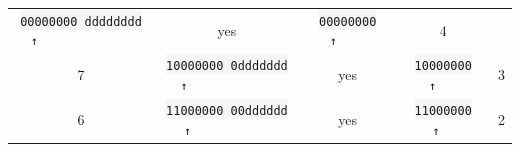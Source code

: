 \begin{longtable}[]{@{}ccccc@{}}
\begin{minipage}[t]{0.26\columnwidth}
\colorbox{WhiteSmoke}{\lstinline!00000000 dddddddd!} \small\verb!   ↑             !\strut
\end{minipage} & \begin{minipage}[t]{0.18\columnwidth}\centering\strut
yes\strut
\end{minipage} & \begin{minipage}[t]{0.14\columnwidth}\centering\strut
\colorbox{WhiteSmoke}{\lstinline!00000000!} \small\verb!   ↑    !\strut
\end{minipage} & \begin{minipage}[t]{0.14\columnwidth}\centering\strut
4\strut
\end{minipage}\tabularnewline
\begin{minipage}[t]{0.13\columnwidth}\centering\strut
7\strut
\end{minipage} & \begin{minipage}[t]{0.26\columnwidth}\centering\strut
\colorbox{WhiteSmoke}{\lstinline!10000000 0ddddddd!} \small\verb!    ↑            !\strut
\end{minipage} & \begin{minipage}[t]{0.18\columnwidth}\centering\strut
yes\strut
\end{minipage} & \begin{minipage}[t]{0.14\columnwidth}\centering\strut
\colorbox{WhiteSmoke}{\lstinline!10000000!} \small\verb!    ↑   !\strut
\end{minipage} & \begin{minipage}[t]{0.14\columnwidth}\centering\strut
3\strut
\end{minipage}\tabularnewline
\begin{minipage}[t]{0.13\columnwidth}\centering\strut
6\strut
\end{minipage} & \begin{minipage}[t]{0.26\columnwidth}\centering\strut
\colorbox{WhiteSmoke}{\lstinline!11000000 00dddddd!} \small\verb!     ↑           !\strut
\end{minipage} & \begin{minipage}[t]{0.18\columnwidth}\centering\strut
yes\strut
\end{minipage} & \begin{minipage}[t]{0.14\columnwidth}\centering\strut
\colorbox{WhiteSmoke}{\lstinline!11000000!} \small\verb!     ↑  !\strut
\end{minipage} & \begin{minipage}[t]{0.14\columnwidth}\centering\strut
2\strut
\end{minipage}\tabularnewline

\end{longtable}
